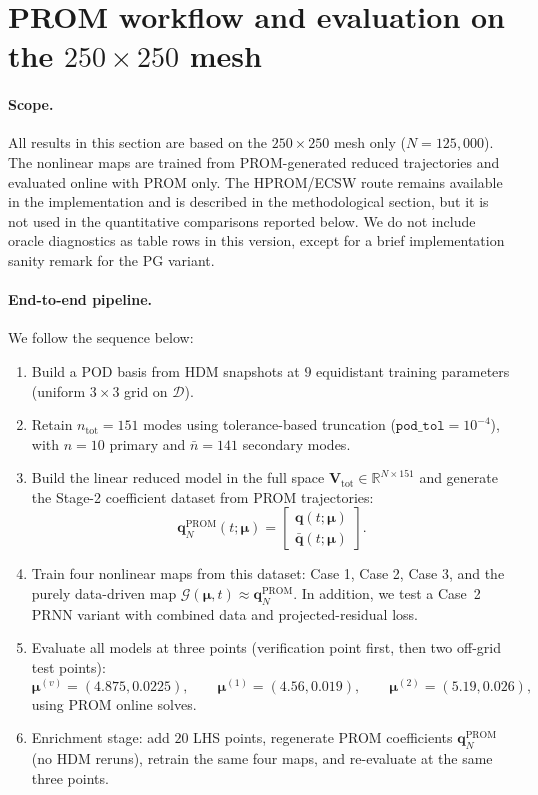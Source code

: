 \documentclass[11pt]{article}
\begin{document}
\section{PROM workflow and evaluation on the $250\times250$ mesh}
\label{sec:prom_250_workflow}

\paragraph{Scope.}
All results in this section are based on the $250\times250$ mesh only ($N=125{,}000$). The nonlinear maps are trained from PROM-generated reduced trajectories and evaluated online with PROM only. The HPROM/ECSW route remains available in the implementation and is described in the methodological section, but it is not used in the quantitative comparisons reported below. We do not include oracle diagnostics as table rows in this version, except for a brief implementation sanity remark for the PG variant.

\paragraph{End-to-end pipeline.}
We follow the sequence below:
\begin{enumerate}
\item Build a POD basis from HDM snapshots at $9$ equidistant training parameters (uniform $3\times3$ grid on $\mathcal D$).
\item Retain $n_{\mathrm{tot}}=151$ modes using tolerance-based truncation ($\texttt{pod\_tol}=10^{-4}$), with $n=10$ primary and $\bar n=141$ secondary modes.
\item Build the linear reduced model in the full space $\mathbf V_{\mathrm{tot}}\in\mathbb R^{N\times151}$ and generate the Stage-2 coefficient dataset from PROM trajectories:
\[
\mathbf q_N^{\mathrm{PROM}}(t;\bm\mu)=\begin{bmatrix}\mathbf q(t;\bm\mu)\\ \bar{\mathbf q}(t;\bm\mu)\end{bmatrix}.
\]
\item Train four nonlinear maps from this dataset: Case 1, Case 2, Case 3, and the purely data-driven map $\mathcal G(\bm\mu,t)\approx \mathbf q_N^{\mathrm{PROM}}$. In addition, we test a Case~2 PRNN variant with combined data and projected-residual loss.
\item Evaluate all models at three points (verification point first, then two off-grid test points):
\[
\bm\mu^{(v)}=(4.875,0.0225),\qquad
\bm\mu^{(1)}=(4.56,0.019),\qquad
\bm\mu^{(2)}=(5.19,0.026),
\]
using PROM online solves.
\item Enrichment stage: add $20$ LHS points, regenerate PROM coefficients $\mathbf q_N^{\mathrm{PROM}}$ (no HDM reruns), retrain the same four maps, and re-evaluate at the same three points.
\end{enumerate}
\end{document}
